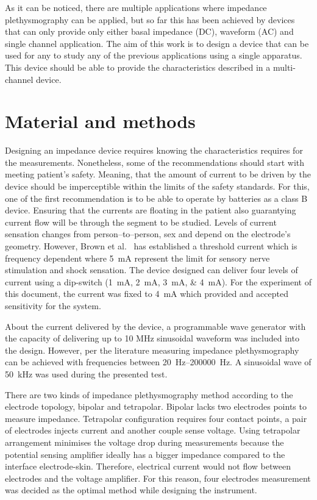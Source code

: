 As it can be noticed, there are multiple applications where impedance plethysmography can be applied, but so far this has been achieved by devices that can only provide only either basal impedance (DC), waveform (AC) and single channel application. The aim of this work is to design a device that can be used for any to study any of the previous applications using a single apparatus. This device should be able to provide the characteristics described in a multi-channel device.  


\section{Material and methods}
Designing an impedance device requires knowing the characteristics requires for the measurements. Nonetheless, some of the recommendations should start with meeting patient's safety. Meaning, that the amount of current to be driven by the device should be imperceptible within the limits of the safety standards. For this, one of the first recommendation is to be able to operate by batteries as a class B device. Ensuring that the currents are floating in the patient also guarantying current flow will be through the segment to be studied. Levels of current sensation changes from person–to–person, sex and depend on the electrode's geometry. However, Brown et al.~\cite{brown1998medical} has established a threshold current which is frequency dependent where \SI{5}{\mA} represent the limit for sensory nerve stimulation and shock sensation. The device designed can deliver four levels of current using a dip-switch (\SIlist{1;2;3;4}{\mA}). For the experiment of this document, the current was fixed to \SI{4}{\mA} which provided and accepted sensitivity for the system. 

About the current delivered by the device, a programmable wave generator with the capacity of delivering up to 10 MHz sinusoidal waveform was included into the design. However, per the literature measuring impedance plethysmography can be achieved with frequencies between \SIrange{20}{200000}{\hertz}. A sinusoidal wave of \SI{50}{\kilo\hertz} was used during the presented test. 

There are two kinds of impedance plethysmography method according to the electrode topology, bipolar and tetrapolar. Bipolar lacks two electrodes points to measure impedance. Tetrapolar configuration requires four contact points, a pair of electrodes injects current and another couple sense voltage. Using tetrapolar arrangement minimises the voltage drop during measurements because the potential sensing amplifier ideally has a bigger impedance compared to the interface electrode-skin. Therefore, electrical current would not flow between electrodes and the voltage amplifier. For this reason, four electrodes measurement was decided as the optimal method while designing the instrument. 

